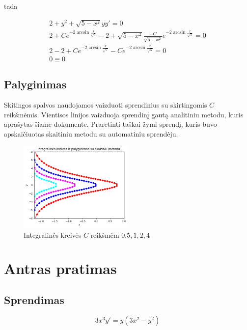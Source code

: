 \documentclass[11pt]{article}
\begin{document}
tada

\begin{equation}
    \begin{split}
        2+y^2+\sqrt{5-x^2}yy'=0\\
        2+Ce^{-2\arcsin{\frac{x}{\sqrt{5}}}} - 2+\sqrt{5-x^2}\frac{-C}{\sqrt{5-x^2}}e^{-2\arcsin{\frac{x}{\sqrt{5}}}}=0\\
        2-2+Ce^{-2\arcsin{\frac{x}{\sqrt{5}}}}-Ce^{-2\arcsin{\frac{x}{\sqrt{5}}}}=0\\
        0\equiv0
    \end{split}
\end{equation}

\subsection{Palyginimas}

Skitingos spalvos naudojamos vaizduoti sprendinius su skirtingomis $C$ reikšmėmis.
Vientisos linijos vaizduoja sprendinį gautą analitiniu metodu, kuris aprašytas šiame dokumente.
Praretinti taškai žymi sprendį, kuris buvo apskaičiuotas skaitiniu metodu su automatiniu sprendėju.

\begin{figure}[h!]
    \centering
    \includegraphics[width=0.5\textwidth]{1.png}
    \caption{Integralinės kreivės $C$ reikšmėm $0.5, 1, 2, 4$}
    \label{fig:sample}
\end{figure}

\newpage
\section{Antras pratimas}

\subsection{Sprendimas}

\begin{equation}
    3x^3y'=y(3x^2-y^2)
\end{equation}
\end{document}
